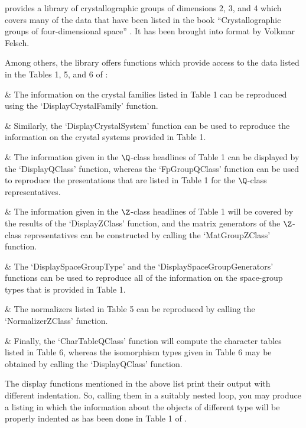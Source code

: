 \def\itm{\llap{$\bullet$ }}



{\GAP} provides a library of  crystallographic groups of dimensions 2, 3,
and 4  which covers many of the  data that have been  listed  in the book
``Crystallographic groups of four-dimensional space'' \cite{BBNWZ78}.
It has been brought into {\GAP} format by Volkmar Felsch.


Among others,  the library  offers functions  which provide access to the
data listed in the Tables 1, 5, and 6 of \cite{BBNWZ78}:

\beginitems 
& \itm The information on the crystal families listed in Table 1 can
       be reproduced using the `DisplayCrystalFamily' function.
       
& \itm Similarly, the `DisplayCrystalSystem' function can be
       used to reproduce the information on the crystal systems
       provided in Table 1.
       
& \itm The information given in the $\Q$-class headlines of
       Table 1 can be displayed by the `DisplayQClass' function,
       whereas the `FpGroupQClass' function can be used to reproduce
       the presentations that are listed in Table 1 for the $\Q$-class
       representatives.
       
& \itm The information given in the $\Z$-class headlines of Table 1
       will be covered by the results of the `DisplayZClass' function,
       and the matrix generators of the $\Z$-class representatives can
       be constructed by calling the `MatGroupZClass' function.
       
& \itm The `DisplaySpaceGroupType' and the
       `DisplaySpaceGroupGenerators' functions can be used to
       reproduce all of the information on the space-group types that
       is provided in Table 1.
       
& \itm The normalizers listed in Table 5 can be reproduced by
       calling the `NormalizerZClass' function.
       
& \itm Finally, the `CharTableQClass' function will compute the
       character tables listed in Table 6, whereas the isomorphism
       types given in Table 6 may be obtained by calling the
       `DisplayQClass' function.  
\enditems

The display functions mentioned in the above list print their output with
different  indentation.  So, calling them in  a suitably nested loop, you
may produce a  listing  in which  the  information about  the objects  of
different type will be properly  indented as has been  done in Table 1 of
\cite{BBNWZ78}.

